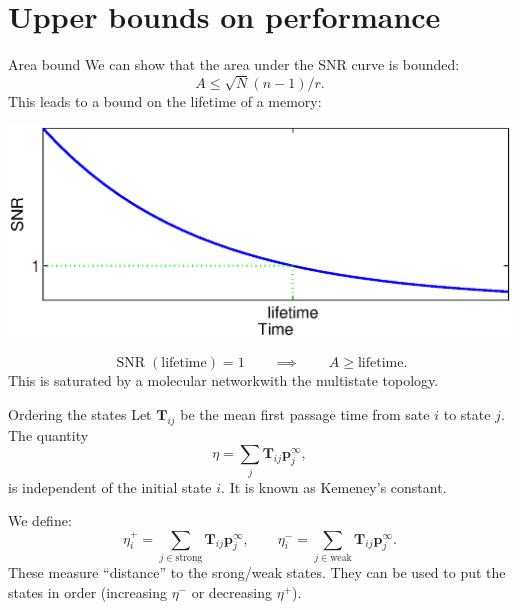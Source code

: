\documentclass[final,hyperref={pdfpagelabels=false,bookmarks=false}]{beamer}
\newcommand{\citerr}[1]{\hfill {\footnotesize{\color{darkgrey}\cite{#1}}}}
\DeclareMathOperator{\SNR}{SNR}
\newcommand{\net}{molecular network}
\newcommand{\eq}{\mathbf{p}^\infty}
\newcommand{\fpt}{\mathbf{T}}
\begin{document}
\begin{frame}{}
\begin{columns}[t]
\begin{column}{0.32\linewidth}
\section{Upper bounds on performance}


\begin{block}{Area bound}
%
 We can show that the area under the SNR curve is bounded:
 \begin{equation*}
   A \leq \sqrt{N}(n-1)/r.
 \end{equation*}
 This leads to a bound on the lifetime of a memory:
 \begin{center}
   \includegraphics[width=15cm]{lifetime.eps}
 \end{center}
 \begin{equation*}
   \SNR(\text{lifetime})=1
   \qquad
   \implies
   \qquad
   A \geq \text{lifetime}.
 \end{equation*}
 This is saturated by a \net with the multistate topology.
%
\end{block}


\begin{block}{Ordering the states}
%
 Let $\fpt_{ij}$ be the mean first passage time from sate $i$ to state $j$. The quantity
 \begin{equation*}
   \eta = \sum_j \fpt_{ij} \eq_j,
 \end{equation*}
 is independent of the initial state $i$.
 It is known as Kemeney's constant. \citerr{kemeny1960finite}

 \vp We define:
 \begin{equation*}
   \eta^+_i = \sum_{j\in\text{strong}} \fpt_{ij} \eq_j,
   \qquad
   \eta^-_i = \sum_{j\in\text{weak}} \fpt_{ij} \eq_j.
 \end{equation*}
 These measure ``distance'' to the srong/weak states.
 They can be used to put the states in order (increasing $\eta^-$ or decreasing $\eta^+$).
%
\end{block}


\end{column}
\end{columns}
\end{frame}
\end{document}
